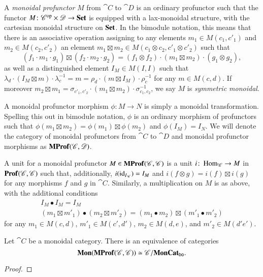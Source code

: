 \documentclass[12pt,oneside,article,draft]{memoir}
\begin{document}
\begin{enumerate}
A \emph{monoidal profunctor} $M$ from $\cat{C}$ to $\cat{D}$ is an ordinary profunctor such that the functor $M\colon {\mathscr{C}}^{\text{op}}\times\mathscr{D}\to\mathbf{Set}$ is equipped with a lax-monoidal structure, with the cartesian monoidal structure on $\mathbf{Set}$.
In the bimodule notation, this means that there is an associative operation assigning to any elements $m_1\in M(c_1,c'_1)$ and $m_2\in M(c_2,c'_2)$ an element $m_1\boxtimes m_2\in M(c_1\otimes c_2,c'_1\otimes c'_2)$ such that
\[
	(f_1\cdot m_1\cdot g_1)\boxtimes(f_2\cdot m_2\cdot g_2) = (f_1\otimes f_2)\cdot(m_1\boxtimes m_2)\cdot(g_1\otimes g_2),
\]
as well as a distinguished element $I_M\in M(I,I)$ such that $\lambda_d\cdot(I_M\boxtimes m)\cdot\lambda^{-1}_c = m = \rho_d\cdot(m\boxtimes I_M)\cdot\rho^{-1}_c$ for any $m\in M(c,d)$.
If moreover $m_2\boxtimes m_1 = \sigma_{c'_1,c'_2}\cdot(m_1\boxtimes m_2)\cdot\sigma_{c_1,c_2}^{-1}$, we say $M$ is \emph{symmetric monoidal}.

A monoidal profunctor morphism $\phi\colon M\to N$ is simply a monoidal transformation.
Spelling this out in bimodule notation, $\phi$ is an ordinary morphism of profunctors such that $\phi(m_1\boxtimes m_2)=\phi(m_1)\boxtimes\phi(m_2)$ and $\phi(I_M)=I_N$.
We will denote the category of monoidal profunctors from $\cat{C}$ to $\cat{D}$ and monoidal profunctor morphisms as $\mathbf{MProf}(\mathscr{C},\mathscr{D})$. 

A unit for a monoidal profunctor $M\in\mathbf{MProf}(\mathscr{C},\mathscr{C})$ is a unit $i\colon\operatorname{Hom}_{\mathscr{C}}\to M$ in $\mathbf{Prof}(\mathscr{C},\mathscr{C})$ such that, additionally, $i(\operatorname{id}_{I_{\mathscr{C}}})=I_M$ and $i(f\otimes g)=i(f)\boxtimes i(g)$ for any morphisms $f$ and $g$ in $\cat{C}$.
Similarly, a multiplication on $M$ is as above, with the additional conditions
\begin{gather*}
	I_M\bullet I_M=I_M \\
	(m_1\boxtimes m'_1)\bullet(m_2\boxtimes m'_2) = (m_1\bullet m_2)\boxtimes(m'_1\bullet m'_2)
\end{gather*}
for any $m_1\in M(c,d)$, $m'_1\in M(c',d')$, $m_2\in M(d,e)$, and $m'_2\in M(d'e')$.

\begin{lemma}\label{Lem:mon profs equal boo functors}
	Let $\cat{C}$ be a monoidal category.
	There is an equivalence of categories 
	\[
		\mathbf{Mon}(\mathbf{MProf}(\mathscr{C},\mathscr{C}))\simeq \mathscr{C}/\mathbf{MonCat}_{\mathsf{bo}}.
	\]
\end{lemma}
\begin{proof}
\end{proof}


\end{enumerate}
\end{document}
